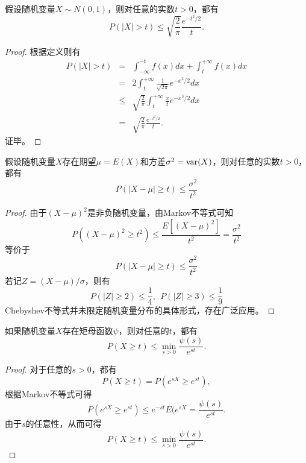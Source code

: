 \begin{theorem}[Mill不等式]
假设随机变量$X\sim N(0,1)$，则对任意的实数$t>0$，都有
\[
    P(|X|>t) \le \sqrt{\frac{2}{\pi}} \frac{e^{-t^2/2}}{t}.
\]
\end{theorem}
\begin{proof}
根据定义则有
\[
\begin{array}{lcl}
    P(|X|>t) &=& \int_{-\infty}^{-t} f(x) dx + \int_t^{+\infty} f(x) dx \\
    &=& 2\int_t^{+\infty} \frac{1}{\sqrt{2\pi}} e^{-x^2/2} dx\\
    &\le& \sqrt{\frac{2}{\pi}} \int_t^{+\infty} \frac{x}{t} e^{-x^2/2} dx\\
    &=& \sqrt{\frac{2}{\pi}} \frac{e^{-t^2/2}}{t}.
\end{array}
\]
证毕。
\end{proof}

\begin{theorem}[Chebyshev不等式]
假设随机变量$X$存在期望$\mu = E(X)$和方差$\sigma^2 = \operatorname{\mathrm{var}}(X)$，则对任意的实数$t>0$，都有
\begin{equation}
    P(|X-\mu|\ge t) \le \frac{\sigma^2}{t^2}
\end{equation}
\end{theorem}
\begin{proof}
由于$(X-\mu)^2$是非负随机变量，由Markov不等式可知
\begin{equation}
    P((X-\mu)^2\ge t^2) \le \frac{E[(X-\mu)^2]}{t^2} = \frac{\sigma^2}{t^2}
\end{equation}
等价于
\begin{equation}
    P(|X-\mu|\ge t) \le \frac{\sigma^2}{t^2}
\end{equation}
若记$Z = (X-\mu)/\sigma$，则有
\begin{equation}
    P(|Z|\ge 2) \le \frac{1}{4}, ~~P(|Z|\ge 3) \le \frac{1}{9}
\end{equation}
Chebyshev不等式并未限定随机变量分布的具体形式，存在广泛应用。
\end{proof}

\begin{theorem}[Chernoff界]
如果随机变量$X$存在矩母函数$\psi$，则对任意的$t$，都有
\[
    P(X\ge t) \le \min\limits_{s>0} \frac{\psi(s)}{e^{st}}.
\]
\end{theorem}
\begin{proof}
对于任意的$s>0$，都有
\[
    P(X\ge t) = P(e^{sX} \ge e^{st}),
\]
根据Markov不等式可得
\[
    P(e^{sX} \ge e^{st}) \le e^{-st} E(e^{sX} = \frac{\psi(s)}{e^{st}}.
\]
由于$s$的任意性，从而可得
\[
    P(X\ge t) \le \min\limits_{s>0} \frac{\psi(s)}{e^{st}}.
\]
\end{proof}

